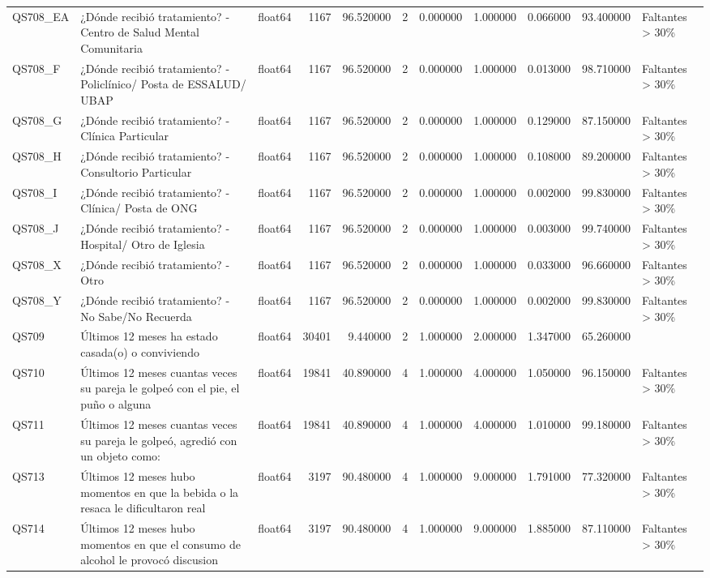 \begin{longtable}{lllrrrrrrrl}
QS708\_EA & ¿Dónde recibió tratamiento? -  Centro de Salud Mental Comunitaria & float64 & 1167 & 96.520000 & 2 & 0.000000 & 1.000000 & 0.066000 & 93.400000 & Faltantes > 30\% \\
QS708\_F & ¿Dónde recibió tratamiento? -  Policlínico/ Posta de ESSALUD/ UBAP & float64 & 1167 & 96.520000 & 2 & 0.000000 & 1.000000 & 0.013000 & 98.710000 & Faltantes > 30\% \\
QS708\_G & ¿Dónde recibió tratamiento? -  Clínica Particular & float64 & 1167 & 96.520000 & 2 & 0.000000 & 1.000000 & 0.129000 & 87.150000 & Faltantes > 30\% \\
QS708\_H & ¿Dónde recibió tratamiento? -  Consultorio Particular & float64 & 1167 & 96.520000 & 2 & 0.000000 & 1.000000 & 0.108000 & 89.200000 & Faltantes > 30\% \\
QS708\_I & ¿Dónde recibió tratamiento? -  Clínica/ Posta de ONG & float64 & 1167 & 96.520000 & 2 & 0.000000 & 1.000000 & 0.002000 & 99.830000 & Faltantes > 30\% \\
QS708\_J & ¿Dónde recibió tratamiento? - Hospital/ Otro de Iglesia & float64 & 1167 & 96.520000 & 2 & 0.000000 & 1.000000 & 0.003000 & 99.740000 & Faltantes > 30\% \\
QS708\_X & ¿Dónde recibió tratamiento? -  Otro & float64 & 1167 & 96.520000 & 2 & 0.000000 & 1.000000 & 0.033000 & 96.660000 & Faltantes > 30\% \\
QS708\_Y & ¿Dónde recibió tratamiento? -  No Sabe/No Recuerda & float64 & 1167 & 96.520000 & 2 & 0.000000 & 1.000000 & 0.002000 & 99.830000 & Faltantes > 30\% \\
QS709 & Últimos 12 meses ha estado casada(o) o conviviendo & float64 & 30401 & 9.440000 & 2 & 1.000000 & 2.000000 & 1.347000 & 65.260000 &  \\
QS710 & Últimos 12 meses cuantas veces su pareja le golpeó con el pie, el puño o alguna  & float64 & 19841 & 40.890000 & 4 & 1.000000 & 4.000000 & 1.050000 & 96.150000 & Faltantes > 30\% \\
QS711 & Últimos 12 meses cuantas veces su pareja le golpeó, agredió con un objeto como:  & float64 & 19841 & 40.890000 & 4 & 1.000000 & 4.000000 & 1.010000 & 99.180000 & Faltantes > 30\% \\
QS713 & Últimos 12 meses hubo momentos en que la bebida o la resaca le dificultaron real & float64 & 3197 & 90.480000 & 4 & 1.000000 & 9.000000 & 1.791000 & 77.320000 & Faltantes > 30\% \\
QS714 & Últimos 12 meses hubo momentos en que el consumo de alcohol le provocó discusion & float64 & 3197 & 90.480000 & 4 & 1.000000 & 9.000000 & 1.885000 & 87.110000 & Faltantes > 30\% \\

\end{longtable}
